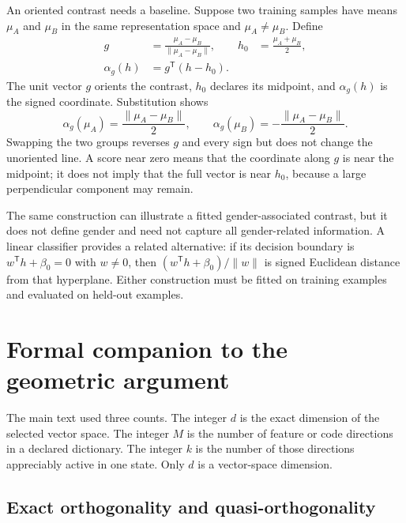 \documentclass[
  aps,
  reprint,
  superscriptaddress,
  floatfix,
  nofootinbib,
  longbibliography
]{revtex4-2}
\newcommand{\T}{^{\mathsf T}}
\newcommand{\norm}[1]{\lVert #1\rVert}
\begin{document}
An oriented contrast needs a baseline.  Suppose two training samples have
means $\mu_A$ and $\mu_B$ in the same representation space and
$\mu_A\ne\mu_B$.  Define
\begin{equation}
\begin{aligned}
 g&=\frac{\mu_A-\mu_B}{\norm{\mu_A-\mu_B}},
 &h_0&=\frac{\mu_A+\mu_B}{2},\\
 \alpha_g(h)&=g\T(h-h_0).
\end{aligned}
 \label{eq:signed-axis-app}
\end{equation}
The unit vector $g$ orients the contrast, $h_0$ declares its midpoint, and
$\alpha_g(h)$ is the signed coordinate.  Substitution shows
\begin{equation}
 \alpha_g(\mu_A)=\frac{\norm{\mu_A-\mu_B}}{2},
 \qquad
 \alpha_g(\mu_B)=-\frac{\norm{\mu_A-\mu_B}}{2}.
 \label{eq:mean-scores-app}
\end{equation}
Swapping the two groups reverses $g$ and every sign but does not change the
unoriented line.  A score near zero means that the coordinate along $g$ is near
the midpoint; it does not imply that the full vector is near $h_0$, because a
large perpendicular component may remain.

The same construction can illustrate a fitted gender-associated contrast,
but it does not define gender and need not capture all gender-related
information.  A linear classifier provides a related alternative: if its
decision boundary is $w\T h+\beta_0=0$ with $w\ne0$, then
$(w\T h+\beta_0)/\norm w$ is signed Euclidean distance from that hyperplane.
Either construction must be fitted on training examples and evaluated on
held-out examples.

\section{Formal companion to the geometric argument}
\label{app:geometry}

The main text used three counts.  The integer $d$ is the exact dimension of
the selected vector space.  The integer $M$ is the number of feature or code
directions in a declared dictionary.  The integer $k$ is the number of those
directions appreciably active in one state.  Only $d$ is a vector-space
dimension.

\subsection{Exact orthogonality and quasi-orthogonality}
\end{document}

